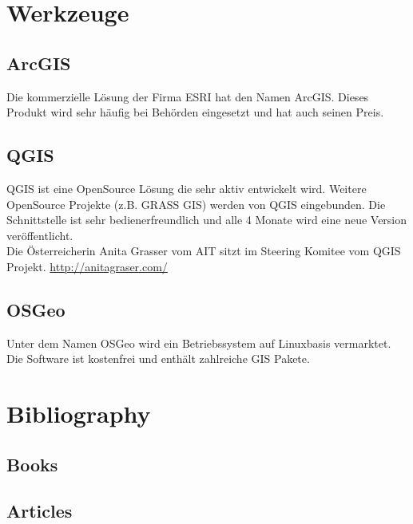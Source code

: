 \documentclass[11pt,fleqn]{book} %
\begin{document}
\chapter{Werkzeuge}
\section{ArcGIS}
Die kommerzielle L\"osung der Firma ESRI hat den Namen ArcGIS. Dieses Produkt wird sehr h\"aufig bei Beh\"orden eingesetzt und hat auch seinen Preis. 
\section{QGIS}
QGIS ist eine OpenSource L\"osung die sehr aktiv entwickelt wird. Weitere OpenSource Projekte (z.B. GRASS GIS) werden von QGIS eingebunden. 
Die Schnittstelle ist sehr bedienerfreundlich und alle 4 Monate wird eine neue Version ver\"offentlicht.
\\
Die \"Osterreicherin Anita Grasser vom AIT sitzt im Steering Komitee vom QGIS Projekt.
\url{http://anitagraser.com/}
\section{OSGeo}
Unter dem Namen OSGeo wird ein Betriebssystem auf Linuxbasis vermarktet. Die Software ist kostenfrei und enth\"alt zahlreiche GIS Pakete.




\chapter*{Bibliography}
\section*{Books}
\printbibliography[heading=bibempty,type=book]
\section*{Articles}
\printbibliography[heading=bibempty,type=article]


\cleardoublepage
{}
\setlength{\columnsep}{0.75cm}
\printindex

\end{document}
